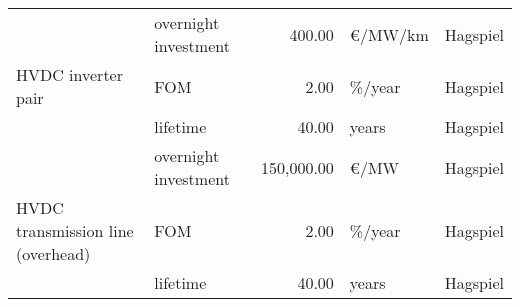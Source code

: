 \begin{longtable}{p{4cm}p{4cm}rp{3cm}p{10cm}}
                      & overnight investment &       400.00 &                   \euro/MW/km &                                                                                                                                                                                                                                                                                                                             Hagspiel \\
HVDC inverter pair & FOM &         2.00 &                       \%/year &                                                                                                                                                                                                                                                                                                                             Hagspiel \\
                      & lifetime &        40.00 &                         years &                                                                                                                                                                                                                                                                                                                             Hagspiel \\
                      & overnight investment &   150,000.00 &                      \euro/MW &                                                                                                                                                                                                                                                                                                                             Hagspiel \\
HVDC transmission line (overhead) & FOM &         2.00 &                       \%/year &                                                                                                                                                                                                                                                                                                                             Hagspiel \\
                      & lifetime &        40.00 &                         years &                                                                                                                                                                                                                                                                                                                             Hagspiel \\

\end{longtable}
